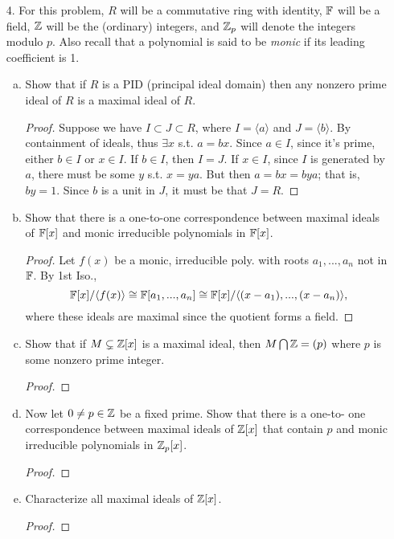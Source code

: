 \begin{itemize}
\item[4.] For this problem, $R$ will be a commutative ring with identity, $\mathbb{F}$ will be a field,
$\mathbb{Z}$ will be the (ordinary) integers, and $\mathbb{Z}_p$ will denote the integers modulo $p$. Also
recall that a polynomial is said to be \textit{monic} if its leading coefficient is 1.
\begin{enumerate}[(a)]
\item Show that if $R$ is a PID (principal ideal domain) then any nonzero
prime ideal of $R$ is a maximal ideal of $R$.
\begin{proof}
    Suppose we have $I \subset J \subset R$, where $I=\langle a \rangle$ and $J=\langle b \rangle$. By containment of ideals, thus $\exists x$ s.t. $a = bx$. Since $a \in I$, since it's prime, either $b \in I$ or $x \in I$. If $b \in I$, then $I = J$. If $x \in I$, since $I$ is generated by $a$, there must be some $y$ s.t. $x = ya$. But then $a = bx = bya$; that is, $by = 1$. Since $b$ is a unit in $J$, it must be that $J = R$.
\end{proof}

\item Show that there is a one-to-one correspondence between maximal ideals
of $\mathbb{F}[x]$ and monic irreducible polynomials in $\mathbb{F}[x]$.
\begin{proof}
    Let $f(x)$ be a monic, irreducible poly. with roots $a_1, ..., a_n$ not in $\mathbb{F}$. By 1st Iso.,
    $$\mathbb{F}[x] / \langle f(x) \rangle \cong \mathbb{F}[a_1, ..., a_n] \cong \mathbb{F}[x] / \langle (x-a_1), ..., (x-a_n) \rangle,$$
    where these ideals are maximal since the quotient forms a field.
\end{proof}

\item Show that if $M \subsetneq \mathbb{Z}[x]$ is a maximal ideal, then $M \bigcap \mathbb{Z} = (p)$ where $p$ is some nonzero prime integer.
\begin{proof}

\end{proof}

\item Now let $0 \neq p \in \mathbb{Z}$ be a fixed prime. Show that there is a one-to-
one correspondence between maximal ideals of $\mathbb{Z}[x]$ that contain $p$ and monic irreducible polynomials in $\mathbb{Z}_p[x]$.
\begin{proof}

\end{proof}

\item Characterize all maximal ideals of $\mathbb{Z}[x]$.
\begin{proof}


\end{proof}
\end{enumerate}
\end{itemize}
